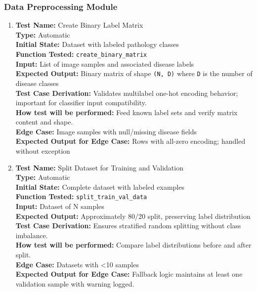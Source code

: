 \documentclass[12pt, titlepage]{article}
\begin{document}
\subsubsection{Data Preprocessing Module}
\begin{enumerate}
  \item \textbf{Test Name:} Create Binary Label Matrix\\
  \textbf{Type:} Automatic\\
  \textbf{Initial State:} Dataset with labeled pathology classes\\
  \textbf{Function Tested:} \verb|create_binary_matrix|\\
  \textbf{Input:} List of image samples and associated disease labels\\
  \textbf{Expected Output:} Binary matrix of shape \verb|(N, D)| where \verb|D| is the number of disease classes\\
  \textbf{Test Case Derivation:} Validates multilabel one-hot encoding behavior; important for classifier input compatibility.\\
  \textbf{How test will be performed:} Feed known label sets and verify matrix content and shape.\\
  \textbf{Edge Case:} Image samples with null/missing disease fields\\
  \textbf{Expected Output for Edge Case:} Rows with all-zero encoding; handled without exception\\

  \item \textbf{Test Name:} Split Dataset for Training and Validation\\
  \textbf{Type:} Automatic\\
  \textbf{Initial State:} Complete dataset with labeled examples\\
  \textbf{Function Tested:} \verb|split_train_val_data|\\
  \textbf{Input:} Dataset of N samples\\
  \textbf{Expected Output:} Approximately 80/20 split, preserving label distribution\\
  \textbf{Test Case Derivation:} Ensures stratified random splitting without class imbalance.\\
  \textbf{How test will be performed:} Compare label distributions before and after split.\\
  \textbf{Edge Case:} Datasets with <10 samples\\
  \textbf{Expected Output for Edge Case:} Fallback logic maintains at least one validation sample with warning logged.\\


\end{enumerate}
\end{document}
